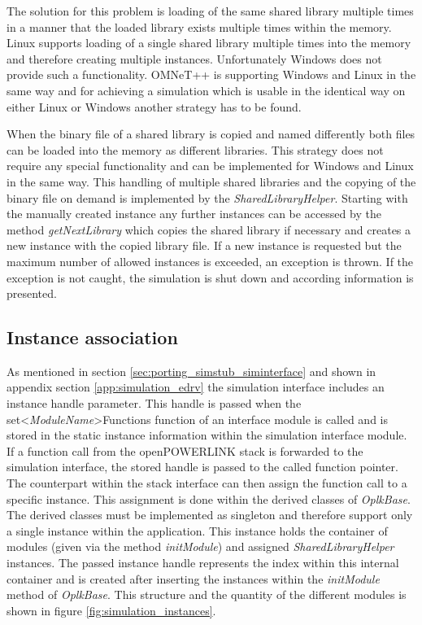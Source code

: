 The solution for this problem is loading of the same shared library multiple times in a manner that the loaded library exists multiple times within the memory.
Linux supports loading of a single shared library multiple times into the memory and therefore creating multiple instances.
Unfortunately Windows does not provide such a functionality.
OMNeT++ is supporting Windows and Linux in the same way and for achieving a simulation which is usable in the identical way on either Linux or Windows another strategy has to be found.

When the binary file of a shared library is copied and named differently both files can be loaded into the memory as different libraries.
This strategy does not require any special functionality and can be implemented for Windows and Linux in the same way.
This handling of multiple shared libraries and the copying of the binary file on demand is implemented by the \emph{SharedLibraryHelper}.
Starting with the manually created instance any further instances can be accessed by the method \emph{getNextLibrary} which copies the shared library if necessary and creates a new instance with the copied library file.
If a new instance is requested but the maximum number of allowed instances is exceeded, an exception is thrown.
If the exception is not caught, the simulation is shut down and according information is presented. %


\subsection{Instance association}
\label{sec:porting_stack_instance_assoc}
As mentioned in section \ref{sec:porting_simstub_siminterface} and shown in appendix section \ref{app:simulation_edrv} the simulation interface includes an instance handle parameter.
This handle is passed when the set<\emph{ModuleName}>Functions function of an interface module is called and is stored in the static instance information within the simulation interface module.
If a function call from the openPOWERLINK stack is forwarded to the simulation interface, the stored handle is passed to the called function pointer.
The counterpart within the stack interface can then assign the function call to a specific instance.
This assignment is done within the derived classes of \emph{OplkBase}.
The derived classes must be implemented as singleton and therefore support only a single instance within the application.
This instance holds the container of modules (given via the method \emph{initModule}) and assigned \emph{SharedLibraryHelper} instances.
The passed instance handle represents the index within this internal container and is created after inserting the instances within the \emph{initModule} method of \emph{OplkBase}.
This structure and the quantity of the different modules is shown in figure \ref{fig:simulation_instances}.

